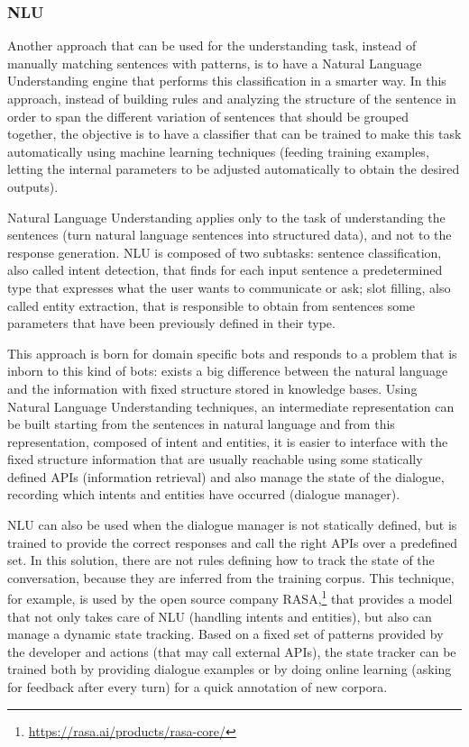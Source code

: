 \subsubsection{NLU}
\label{soaNLUIntro}

Another approach that can be used for the understanding task, instead of manually matching sentences with patterns, is to have a Natural Language Understanding engine that performs this classification in a smarter way. In this approach, instead of building rules and analyzing the structure of the sentence in order to span the different variation of sentences that should be grouped together, the objective is to have a classifier that can be trained to make this task automatically using machine learning techniques (feeding training examples, letting the internal parameters to be adjusted automatically to obtain the desired outputs).

Natural Language Understanding applies only to the task of understanding the sentences (turn natural language sentences into structured data), and not to the response generation. NLU is composed of two subtasks: sentence classification, also called intent detection, that finds for each input sentence a predetermined type that expresses what the user wants to communicate or ask; slot filling, also called entity extraction, that is responsible to obtain from sentences some parameters that have been previously defined in their type.

This approach is born for domain specific bots and responds to a problem that is inborn to this kind of bots: exists a big difference between the natural language and the information with fixed structure stored in knowledge bases. Using Natural Language Understanding techniques, an intermediate representation can be built starting from the sentences in natural language and from this representation, composed of intent and entities, it is easier to interface with the fixed structure information that are usually reachable using some statically defined APIs (information retrieval) and also manage the state of the dialogue, recording which intents and entities have occurred (dialogue manager).

NLU can also be used when the dialogue manager is not statically defined, but is trained to provide the correct responses and call the right APIs over a predefined set. In this solution, there are not rules defining how to track the state of the conversation, because they are inferred from the training corpus. This technique, for example, is used by the open source company RASA,\footnote{\url{https://rasa.ai/products/rasa-core/}} that provides a model that not only takes care of NLU (handling intents and entities), but also can manage a dynamic state tracking. Based on a fixed set of patterns provided by the developer and actions (that may call external APIs), the state tracker can be trained both by providing dialogue examples or by doing online learning (asking for feedback after every turn) for a quick annotation of new corpora.

